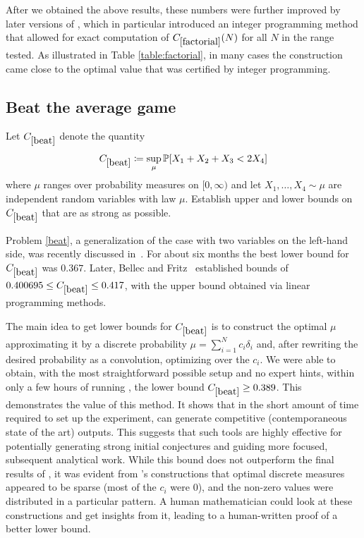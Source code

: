 After we obtained the above results, these numbers were further improved by later versions of \cite{ventullo}, which in particular introduced an integer programming method that allowed for exact computation of $C_{\ref{factorial}}(N)$ for all $N$ in the range tested.  As illustrated in Table \ref{table:factorial}, in many cases the \AlphaEvolve construction came close to the optimal value that was certified by integer programming.





\subsection{Beat the average game}


\renewcommand{\problemURL}{https://google-deepmind.github.io/alphaevolve_repository_of_problems/problems/39.html}

\begin{problem}\label{beat}  Let $C_{\ref{beat}}$ denote the quantity
$$C_{\ref{beat}} \coloneqq \sup_{\mu} \mathbb{P}[X_1 + X_2 + X_3 < 2X_4]$$
where $\mu$ ranges over probability measures on $[0, \infty)$ and let $X_1, \ldots, X_4 \sim \mu$ are independent random variables with law $\mu$. Establish upper and lower bounds on $C_{\ref{beat}}$ that are as strong as possible.
\end{problem}

Problem \ref{beat}, a generalization of the case with two variables on the left-hand side, was recently discussed in~\cite{mathoverflow474916}. For about six months the best lower bound for $C_{\ref{beat}}$ was $0.367$. Later, Bellec and Fritz~\cite{bellec2024optimizing} established bounds of $0.400695 \leq C_{\ref{beat}} \leq 0.417$, with the upper bound obtained via linear programming methods.

The main idea to get lower bounds for $C_{\ref{beat}}$ is to construct the optimal $\mu$ approximating it by a discrete probability $\mu = \sum_{i=1}^{N} c_i \delta_i$ and, after rewriting the desired probability as a convolution, optimizing over the $c_i$. We were able to obtain, with the most straightforward possible \AlphaEvolve setup and no expert hints, within only a few hours of running \AlphaEvolve, the lower bound $C_{\ref{beat}} \geq 0.389$. This demonstrates the value of this method. It shows that in the short amount of time required to set up the experiment, \AlphaEvolve can generate competitive (contemporaneous state of the art) outputs. This suggests that such tools are highly effective for potentially generating strong initial conjectures and guiding more focused, subsequent analytical work.
While this bound does not outperform the final results of \cite{bellec2024optimizing}, it was evident from \AlphaEvolve's constructions that optimal discrete measures appeared to be sparse (most of the $c_i$ were 0), and the non-zero values were distributed in a particular pattern. A human mathematician could look at these constructions and get insights from it, leading to a human-written proof of a better lower bound.

